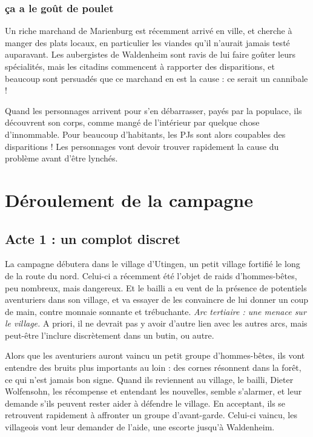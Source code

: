 \documentclass[10pt,a4paper]{book}
\begin{document}
\subsection{ça a le goût de poulet}
Un riche marchand de Marienburg est récemment arrivé en ville, et cherche à manger des plats locaux, en particulier les viandes qu'il n'aurait jamais testé auparavant. Les aubergistes de Waldenheim sont ravis de lui faire goûter leurs spécialités, mais les citadins commencent à rapporter des disparitions, et beaucoup sont persuadés que ce marchand en est la cause : ce serait un cannibale !

Quand les personnages arrivent pour s'en débarrasser, payés par la populace, ils découvrent son corps, comme mangé de l'intérieur par quelque chose d'innommable. Pour beaucoup d'habitants, les PJs sont alors coupables des disparitions ! Les personnages vont devoir trouver rapidement la cause du problème avant d'être lynchés.
\chapter{Déroulement de la campagne}
\section{Acte 1 : un complot discret}
La campagne débutera dans le village d'Utingen, un petit village fortifié le long de la route du nord. Celui-ci a récemment été l'objet de raids d'hommes-bêtes, peu nombreux, mais dangereux. Et le bailli a eu vent de la présence de potentiels aventuriers dans son village, et va essayer de les convaincre de lui donner un coup de main, contre monnaie sonnante et trébuchante. \emph{Arc tertiaire : une menace sur le village.} A priori, il ne devrait pas y avoir d'autre lien avec les autres arcs, mais peut-être l'inclure discrètement dans un butin, ou autre. 

Alors que les aventuriers auront vaincu un petit groupe d'hommes-bêtes, ils vont entendre des bruits plus importants au loin : des cornes résonnent dans la forêt, ce qui n'est jamais bon signe. Quand ils reviennent au village, le bailli, Dieter Wolfensohn, les récompense et entendant les nouvelles, semble s'alarmer, et leur demande s'ils peuvent rester aider à défendre le village. En acceptant, ils se retrouvent rapidement à affronter un groupe d'avant-garde. Celui-ci vaincu, les villageois vont leur demander de l'aide, une escorte jusqu'à Waldenheim.
\end{document}

